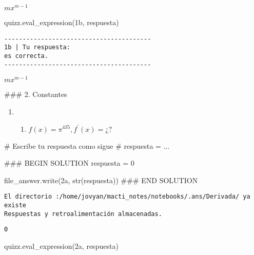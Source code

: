 \documentclass[
  letterpaper,
  DIV=11,
  numbers=noendperiod]{scrreprt}
\newenvironment{Shaded}{\begin{snugshade}}{\end{snugshade}}
\newcommand{\BuiltInTok}[1]{\textcolor[rgb]{0.00,0.23,0.31}{#1}}
\newcommand{\CommentTok}[1]{\textcolor[rgb]{0.37,0.37,0.37}{#1}}
\newcommand{\DecValTok}[1]{\textcolor[rgb]{0.68,0.00,0.00}{#1}}
\newcommand{\NormalTok}[1]{\textcolor[rgb]{0.00,0.23,0.31}{#1}}
\newcommand{\OperatorTok}[1]{\textcolor[rgb]{0.37,0.37,0.37}{#1}}
\newcommand{\RegionMarkerTok}[1]{\textcolor[rgb]{0.00,0.23,0.31}{#1}}
\newcommand{\StringTok}[1]{\textcolor[rgb]{0.13,0.47,0.30}{#1}}
\providecommand{\tightlist}{%
  \setlength{\itemsep}{0pt}\setlength{\parskip}{0pt}}\usepackage{longtable,booktabs,array}
\begin{document}
$\displaystyle m x^{m - 1}$

\begin{Shaded}
\begin{Highlighting}[]
\NormalTok{quizz.eval\_expression(}\StringTok{\textquotesingle{}1b\textquotesingle{}}\NormalTok{, respuesta)}
\end{Highlighting}
\end{Shaded}

\begin{verbatim}
----------------------------------------
1b | Tu respuesta:
es correcta.
----------------------------------------
\end{verbatim}

$\displaystyle m x^{m - 1}$

\#\#\# 2. Constantes

\begin{enumerate}
\def\labelenumi{\arabic{enumi}.}
\setcounter{enumi}{1}
\tightlist
\item
  \begin{enumerate}
  \def\labelenumii{\alph{enumii}.}
  \tightlist
  \item
    \(f(x) = \pi^{435}, f^\prime(x)= ¿?\)
  \end{enumerate}
\end{enumerate}

\begin{Shaded}
\begin{Highlighting}[]
\CommentTok{\# Escribe tu respuesta como sigue }
\CommentTok{\# respuesta = ...}

\CommentTok{\#\#\# }\RegionMarkerTok{BEGIN}\CommentTok{ SOLUTION}
\NormalTok{respuesta }\OperatorTok{=} \DecValTok{0}

\NormalTok{file\_answer.write(}\StringTok{\textquotesingle{}2a\textquotesingle{}}\NormalTok{, }\BuiltInTok{str}\NormalTok{(respuesta))}
\CommentTok{\#\#\# }\RegionMarkerTok{END}\CommentTok{ SOLUTION}

\end{Highlighting}
\end{Shaded}

\begin{verbatim}
El directorio :/home/jovyan/macti_notes/notebooks/.ans/Derivada/ ya existe
Respuestas y retroalimentación almacenadas.
\end{verbatim}

\begin{verbatim}
0
\end{verbatim}

\begin{Shaded}
\begin{Highlighting}[]
\NormalTok{quizz.eval\_expression(}\StringTok{\textquotesingle{}2a\textquotesingle{}}\NormalTok{, respuesta)}
\end{Highlighting}
\end{Shaded}
\end{document}
